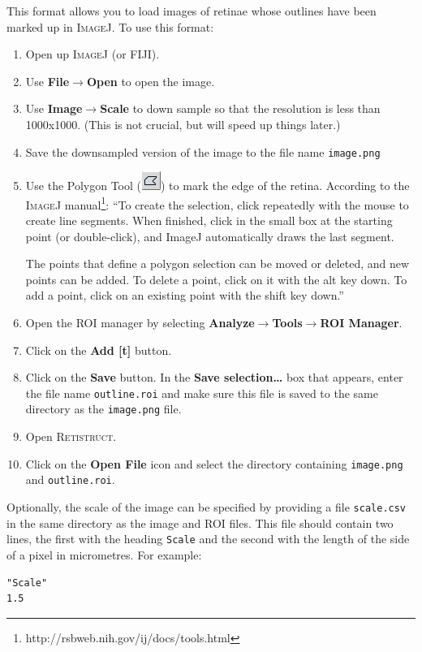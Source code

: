 \documentclass{article}
\begin{document}
This format allows you to load images of retinae whose outlines have
been marked up in \textsc{ImageJ}. To use this format:
\begin{enumerate}
\item Open up \textsc{ImageJ} (or FIJI).
\item Use \textbf{File$\rightarrow$Open} to open the image.
\item Use \textbf{Image$\rightarrow$Scale} to down sample so that the
  resolution is less than 1000x1000. (This is not crucial, but will
  speed up things later.)
\item Save the downsampled version of the image to the file name
  \texttt{image.png}
\item Use the Polygon Tool
  (\includegraphics[height=\baselineskip]{poly}) to mark the edge of
  the retina. According to the \textsc{ImageJ}
  manual\footnote{http://rsbweb.nih.gov/ij/docs/tools.html}: ``To
  create the selection, click repeatedly with the mouse to create line
  segments. When finished, click in the small box at the starting
  point (or double-click), and ImageJ automatically draws the last
  segment.

  The points that define a polygon selection can be moved or deleted,
  and new points can be added. To delete a point, click on it with the
  alt key down. To add a point, click on an existing point with the
  shift key down.''
\item Open the ROI manager by selecting
\textbf{Analyze$\rightarrow$Tools$\rightarrow$ROI Manager}.
\item Click on the \textbf{Add [t]} button.
\item Click on the \textbf{Save} button. In the \textbf{Save
selection\dots} box that appears, enter the file name
\texttt{outline.roi} and make sure this file is saved to the same
directory as the \texttt{image.png} file.
\item Open \textsc{Retistruct}.
\item Click on the \textbf{Open File} icon and select the directory
containing \texttt{image.png} and \texttt{outline.roi}.
\end{enumerate}

Optionally, the scale of the image can be specified by providing a
file \texttt{scale.csv} in the same directory as the image and ROI
files. This file should contain two lines, the first with the heading
\texttt{Scale} and the second with the length of the side of a pixel
in micrometres. For example:
\begin{verbatim}
"Scale"
1.5
\end{verbatim}
\end{document}
